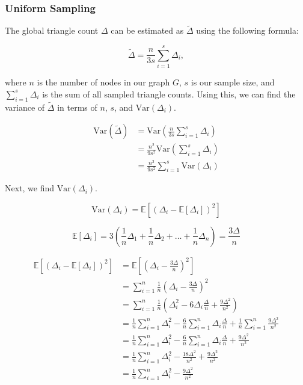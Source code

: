 \documentclass[11pt]{article}
\begin{document}
\subsubsection{Uniform Sampling}

The global triangle count $\Delta$ can be estimated as $\tilde{\Delta}$ using the following formula:

\[
\tilde{\Delta} = \frac{n}{3s} \sum_{i = 1}^{s} \Delta_i,
\]

where $n$ is the number of nodes in our graph $G$, $s$ is our sample size, and $\sum_{i = 1}^{s} \Delta_i$ is the sum of all sampled triangle counts. 
Using this, we can find the variance of $\tilde{\Delta}$ in terms of $n$, $s$, and $\mathrm{Var}(\Delta_i)$.

\[
\begin{aligned}
\mathrm{Var}(\tilde{\Delta}) &= \mathrm{Var} \left( \frac{n}{3s} \sum_{i=1}^{s} \Delta_i \right) \\
&= \frac{n^2}{9s^2} \mathrm{Var} \left( \sum_{i=1}^{s} \Delta_i \right) \\
&= \frac{n^2}{9s^2} \sum_{i=1}^{s} \mathrm{Var}(\Delta_i)
\end{aligned}
\]

Next, we find $\mathrm{Var}(\Delta_i)$.

\[
\mathrm{Var}(\Delta_i) = \mathbb{E}[(\Delta_i - \mathbb{E}[\Delta_i])^2]
\]

\[
\mathbb{E}[\Delta_i] = 3(\frac{1}{n} \Delta_1 + \frac{1}{n} \Delta_2 + \ldots + \frac{1}{n} \Delta_n) = \frac{3\Delta}{n}
\]

\[
\begin{aligned}
\mathbb{E}[(\Delta_i - \mathbb{E}[\Delta_i])^2] &= \mathbb{E}[(\Delta_i - \frac{3\Delta}{n})^2] \\
&= \sum_{i = 1}^{n} \frac{1}{n} (\Delta_i - \frac{3\Delta}{n})^2 \\
&= \sum_{i = 1}^{n} \frac{1}{n} (\Delta_i^2 - 6 \Delta_i \frac{\Delta}{n} + \frac{9\Delta^2}{n^2}) \\
&= \frac{1}{n} \sum_{i = 1}^{n} \Delta_i^2 - \frac{6}{n} \sum_{i = 1}^{n} \Delta_i \frac{\Delta}{n} + \frac{1}{n} \sum_{i = 1}^{n} \frac{9\Delta^2}{n^2} \\
&= \frac{1}{n} \sum_{i = 1}^{n} \Delta_i^2 - \frac{6}{n} \sum_{i = 1}^{n} \Delta_i \frac{\Delta}{n} + \frac{9\Delta^2}{n^2} \\
&= \frac{1}{n} \sum_{i = 1}^{n} \Delta_i^2 - \frac{18\Delta^2}{n^2} + \frac{9\Delta^2}{n^2} \\
&= \frac{1}{n} \sum_{i = 1}^{n} \Delta_i^2 - \frac{9\Delta^2}{n^2}
\end{aligned}
\]
\end{document}
